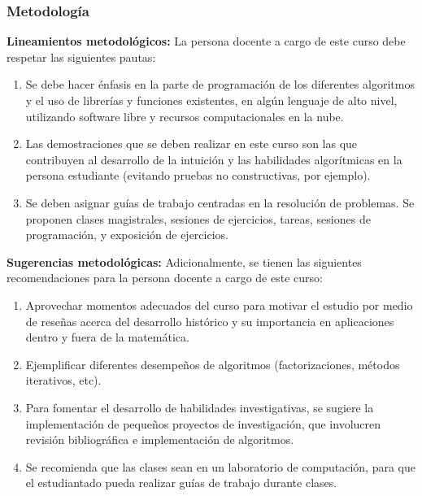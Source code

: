 \begin{refsection}
\begin{enumerate}
\end{enumerate}


\subsubsection*{Metodología}

\noindent \textbf{Lineamientos metodológicos:} La persona docente a cargo de este curso debe respetar las siguientes pautas:
\begin{enumerate}
    \item Se debe hacer énfasis en la parte de programación de los diferentes algoritmos y el uso de librerías y funciones existentes, en algún lenguaje de alto nivel, utilizando software libre y recursos computacionales en la nube.
    \item Las demostraciones que se deben realizar en este curso son las que contribuyen al desarrollo de la intuición y las habilidades algorítmicas en la persona estudiante (evitando pruebas no constructivas, por ejemplo).
    \item Se deben asignar guías de trabajo centradas en la resolución de problemas. Se proponen clases magistrales, sesiones de ejercicios, tareas, sesiones de programación, y exposición de ejercicios.
\end{enumerate}

\textbf{Sugerencias metodológicas:} Adicionalmente, se tienen las siguientes recomendaciones para la persona docente a cargo de este curso:
\begin{enumerate}
    \item Aprovechar momentos adecuados del curso para motivar el estudio por medio de reseñas acerca del desarrollo histórico  y su importancia en aplicaciones dentro y fuera de la matemática.
    \item Ejemplificar diferentes desempeños de algoritmos (factorizaciones, métodos iterativos, etc).
    \item Para fomentar el desarrollo de habilidades investigativas, se sugiere la implementación de pequeños proyectos de investigación, que involucren revisión bibliográfica e implementación de algoritmos.
    \item Se recomienda que las clases sean en un laboratorio de computación, para que el estudiantado pueda realizar guías de trabajo durante clases.
\end{enumerate}


\end{refsection}

